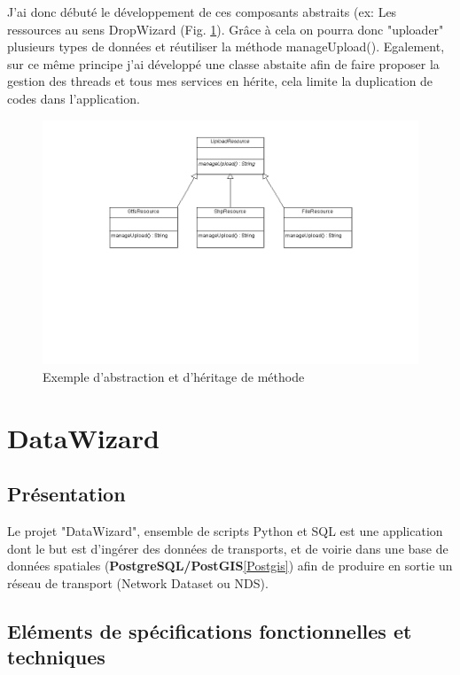 \begin{itemize}
J'ai donc débuté le développement de ces composants abstraits (ex: Les ressources au sens DropWizard (Fig. \ref{UML1}). Grâce à cela on pourra donc "uploader" plusieurs types de données et réutiliser la méthode manageUpload(). Egalement, sur ce même principe j'ai développé une classe abstaite afin de faire proposer la gestion des threads et tous mes services en hérite, cela limite la duplication de codes dans l'application.\\
\begin{figure}[!h]
\centering
\includegraphics[width=14cm]{images/Diagrammedeclasses_heritage_full.png}
\caption{\label{UML1}Exemple d'abstraction et d'héritage de méthode}
\end{figure} 



\section{DataWizard}

\subsection{Présentation}

Le projet "DataWizard", ensemble de scripts Python et SQL est une application dont le but est d'ingérer des données de transports, et de voirie dans une base de données spatiales (\textbf{PostgreSQL/PostGIS}\ref{Postgis}) afin de produire en sortie un réseau de transport (Network Dataset ou NDS).\\


\subsection{Eléments de spécifications fonctionnelles et techniques}


\end{itemize}
